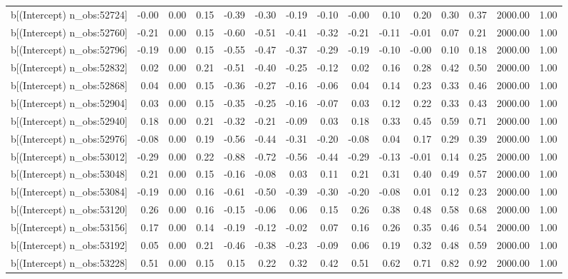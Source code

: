 \begin{table}[ht]
\begin{tabular}{rrrrrrrrrrrrrrr}
  b[(Intercept) n\_obs:52724] & -0.00 & 0.00 & 0.15 & -0.39 & -0.30 & -0.19 & -0.10 & -0.00 & 0.10 & 0.20 & 0.30 & 0.37 & 2000.00 & 1.00 \\ 
  b[(Intercept) n\_obs:52760] & -0.21 & 0.00 & 0.15 & -0.60 & -0.51 & -0.41 & -0.32 & -0.21 & -0.11 & -0.01 & 0.07 & 0.21 & 2000.00 & 1.00 \\ 
  b[(Intercept) n\_obs:52796] & -0.19 & 0.00 & 0.15 & -0.55 & -0.47 & -0.37 & -0.29 & -0.19 & -0.10 & -0.00 & 0.10 & 0.18 & 2000.00 & 1.00 \\ 
  b[(Intercept) n\_obs:52832] & 0.02 & 0.00 & 0.21 & -0.51 & -0.40 & -0.25 & -0.12 & 0.02 & 0.16 & 0.28 & 0.42 & 0.50 & 2000.00 & 1.00 \\ 
  b[(Intercept) n\_obs:52868] & 0.04 & 0.00 & 0.15 & -0.36 & -0.27 & -0.16 & -0.06 & 0.04 & 0.14 & 0.23 & 0.33 & 0.46 & 2000.00 & 1.00 \\ 
  b[(Intercept) n\_obs:52904] & 0.03 & 0.00 & 0.15 & -0.35 & -0.25 & -0.16 & -0.07 & 0.03 & 0.12 & 0.22 & 0.33 & 0.43 & 2000.00 & 1.00 \\ 
  b[(Intercept) n\_obs:52940] & 0.18 & 0.00 & 0.21 & -0.32 & -0.21 & -0.09 & 0.03 & 0.18 & 0.33 & 0.45 & 0.59 & 0.71 & 2000.00 & 1.00 \\ 
  b[(Intercept) n\_obs:52976] & -0.08 & 0.00 & 0.19 & -0.56 & -0.44 & -0.31 & -0.20 & -0.08 & 0.04 & 0.17 & 0.29 & 0.39 & 2000.00 & 1.00 \\ 
  b[(Intercept) n\_obs:53012] & -0.29 & 0.00 & 0.22 & -0.88 & -0.72 & -0.56 & -0.44 & -0.29 & -0.13 & -0.01 & 0.14 & 0.25 & 2000.00 & 1.00 \\ 
  b[(Intercept) n\_obs:53048] & 0.21 & 0.00 & 0.15 & -0.16 & -0.08 & 0.03 & 0.11 & 0.21 & 0.31 & 0.40 & 0.49 & 0.57 & 2000.00 & 1.00 \\ 
  b[(Intercept) n\_obs:53084] & -0.19 & 0.00 & 0.16 & -0.61 & -0.50 & -0.39 & -0.30 & -0.20 & -0.08 & 0.01 & 0.12 & 0.23 & 2000.00 & 1.00 \\ 
  b[(Intercept) n\_obs:53120] & 0.26 & 0.00 & 0.16 & -0.15 & -0.06 & 0.06 & 0.15 & 0.26 & 0.38 & 0.48 & 0.58 & 0.68 & 2000.00 & 1.00 \\ 
  b[(Intercept) n\_obs:53156] & 0.17 & 0.00 & 0.14 & -0.19 & -0.12 & -0.02 & 0.07 & 0.16 & 0.26 & 0.35 & 0.46 & 0.54 & 2000.00 & 1.00 \\ 
  b[(Intercept) n\_obs:53192] & 0.05 & 0.00 & 0.21 & -0.46 & -0.38 & -0.23 & -0.09 & 0.06 & 0.19 & 0.32 & 0.48 & 0.59 & 2000.00 & 1.00 \\ 
  b[(Intercept) n\_obs:53228] & 0.51 & 0.00 & 0.15 & 0.15 & 0.22 & 0.32 & 0.42 & 0.51 & 0.62 & 0.71 & 0.82 & 0.92 & 2000.00 & 1.00 \\ 

\end{tabular}
\end{table}
